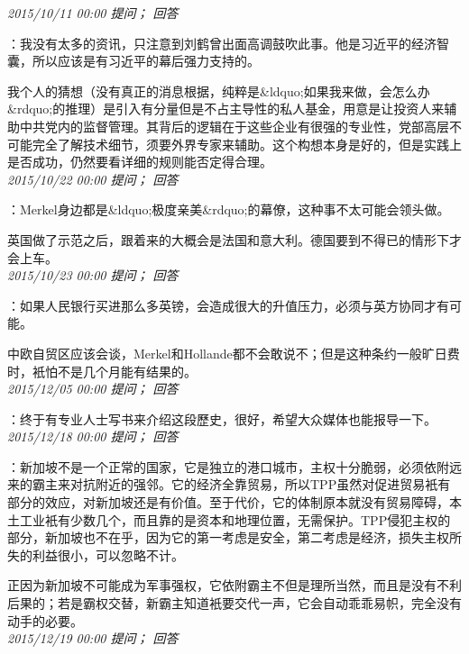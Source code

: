 \documentclass[twocolumn]{ctexart}
\begin{document}
\textit{\hfill\noindent\small 2015/10/11 00:00 提问； 回答}

：我没有太多的资讯，只注意到刘鹤曾出面高调鼓吹此事。他是习近平的经济智囊，所以应该是有习近平的幕后强力支持的。

我个人的猜想（没有真正的消息根据，纯粹是\&ldquo;如果我来做，会怎么办\&rdquo;的推理）是引入有分量但是不占主导性的私人基金，用意是让投资人来辅助中共党内的监督管理。其背后的逻辑在于这些企业有很强的专业性，党部高层不可能完全了解技术细节，须要外界专家来辅助。这个构想本身是好的，但是实践上是否成功，仍然要看详细的规则能否定得合理。\\

\textit{\hfill\noindent\small 2015/10/22 00:00 提问； 回答}

：Merkel身边都是\&ldquo;极度亲美\&rdquo;的幕僚，这种事不太可能会领头做。

英国做了示范之后，跟着来的大概会是法国和意大利。德国要到不得已的情形下才会上车。\\

\textit{\hfill\noindent\small 2015/10/23 00:00 提问； 回答}

：如果人民银行买进那么多英镑，会造成很大的升值压力，必须与英方协同才有可能。

中欧自贸区应该会谈，Merkel和Hollande都不会敢说不；但是这种条约一般旷日费时，衹怕不是几个月能有结果的。\\

\textit{\hfill\noindent\small 2015/12/05 00:00 提问； 回答}

：终于有专业人士写书来介绍这段歷史，很好，希望大众媒体也能报导一下。\\

\textit{\hfill\noindent\small 2015/12/18 00:00 提问； 回答}

：新加坡不是一个正常的国家，它是独立的港口城市，主权十分脆弱，必须依附远来的霸主来对抗附近的强邻。它的经济全靠贸易，所以TPP虽然对促进贸易衹有部分的效应，对新加坡还是有价值。至于代价，它的体制原本就没有贸易障碍，本土工业衹有少数几个，而且靠的是资本和地理位置，无需保护。TPP侵犯主权的部分，新加坡也不在乎，因为它的第一考虑是安全，第二考虑是经济，损失主权所失的利益很小，可以忽略不计。

正因为新加坡不可能成为军事强权，它依附霸主不但是理所当然，而且是没有不利后果的；若是霸权交替，新霸主知道衹要交代一声，它会自动乖乖易帜，完全没有动手的必要。\\

\textit{\hfill\noindent\small 2015/12/19 00:00 提问； 回答}
\end{document}
